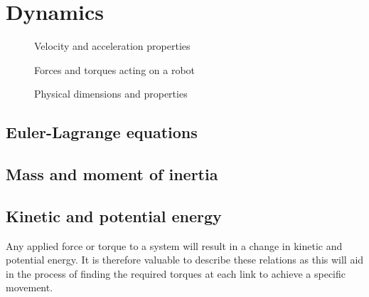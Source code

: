 \section{Dynamics}

\begin{figure}[h!]    
    \centering           
    \def\svgwidth{\columnwidth}
    
    \caption{Velocity and acceleration properties}
    \label{speed}
\end{figure}

\begin{figure}[h!]    
    \centering           
    \def\svgwidth{\columnwidth}
    
    \caption{Forces and torques acting on a robot}
    \label{forces}
\end{figure}

\begin{figure}[h!]    
    \centering           
    \def\svgwidth{\columnwidth}
    
    \caption{Physical dimensions and properties}
    \label{physical}
\end{figure}


\subsection{Euler-Lagrange equations}

\subsection{Mass and moment of inertia}

\subsection{Kinetic and potential energy}


Any applied force or torque to a system will result in a change in kinetic and potential energy. It is therefore valuable to describe these relations as this will aid in the process of finding the required torques at each link to achieve a specific movement.

